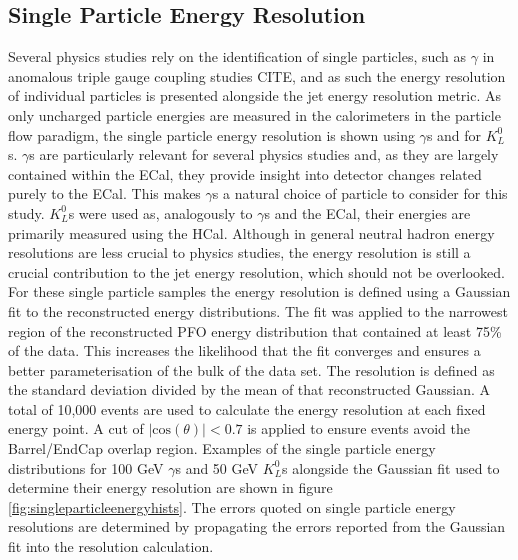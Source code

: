 \subsection{Single Particle Energy Resolution}
Several physics studies rely on the identification of single particles, such as $\gamma$ in anomalous triple gauge coupling studies CITE, and as such the energy resolution of individual particles is presented alongside the jet energy resolution metric.  As only uncharged particle energies are measured in the calorimeters in the particle flow paradigm, the single particle energy resolution is shown using $\gamma$s and for $K^{0}_{L}$s.  $\gamma$s are particularly relevant for several physics studies and, as they are largely contained within the ECal, they provide insight into detector changes related purely to the ECal.  This makes $\gamma$s a natural choice of particle to consider for this study.  $K^{0}_{L}$s were used as, analogously to $\gamma$s and the ECal, their energies are primarily measured using the HCal.  Although in general neutral hadron energy resolutions are less crucial to physics studies, the energy resolution is still a crucial contribution to the jet energy resolution, which should not be overlooked.  For these single particle samples the energy resolution is defined using a Gaussian fit to the reconstructed energy distributions.  The fit was applied to the narrowest region of the reconstructed PFO energy distribution that contained at least 75\% of the data.  This increases the likelihood that the fit converges and ensures a better parameterisation of the bulk of the data set.  The resolution is defined as the standard deviation divided by the mean of that reconstructed Gaussian.  A total of 10,000 events are used to calculate the energy resolution at each fixed energy point.  A cut of $|\text{cos}(\theta)| < 0.7$ is applied to ensure events avoid the Barrel/EndCap overlap region.  Examples of the single particle energy distributions for 100 GeV $\gamma$s and 50 GeV $K^{0}_{L}$s alongside the Gaussian fit used to determine their energy resolution are shown in figure \ref{fig:singleparticleenergyhists}.  The errors quoted on single particle energy resolutions are determined by propagating the errors reported from the Gaussian fit into the resolution calculation.  


